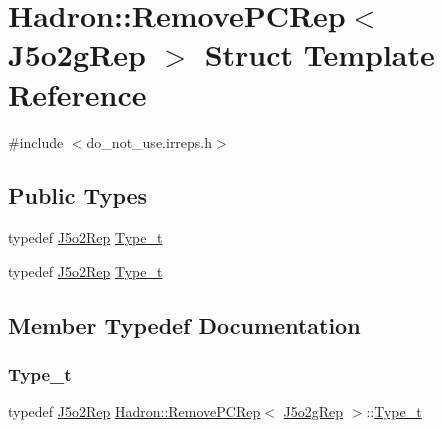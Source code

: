 \hypertarget{structHadron_1_1RemovePCRep_3_01J5o2gRep_01_4}{}\section{Hadron\+:\+:Remove\+P\+C\+Rep$<$ J5o2g\+Rep $>$ Struct Template Reference}
\label{structHadron_1_1RemovePCRep_3_01J5o2gRep_01_4}


{\ttfamily \#include $<$do\+\_\+not\+\_\+use.\+irreps.\+h$>$}

\subsection*{Public Types}
\begin{DoxyCompactItemize}
\item 
typedef \mbox{\hyperlink{structHadron_1_1J5o2Rep}{J5o2\+Rep}} \mbox{\hyperlink{structHadron_1_1RemovePCRep_3_01J5o2gRep_01_4_a2c403d167c34bc5b00820e498b1d6fd3}{Type\+\_\+t}}
\item 
typedef \mbox{\hyperlink{structHadron_1_1J5o2Rep}{J5o2\+Rep}} \mbox{\hyperlink{structHadron_1_1RemovePCRep_3_01J5o2gRep_01_4_a2c403d167c34bc5b00820e498b1d6fd3}{Type\+\_\+t}}
\end{DoxyCompactItemize}


\subsection{Member Typedef Documentation}
\mbox{\label{structHadron_1_1RemovePCRep_3_01J5o2gRep_01_4_a2c403d167c34bc5b00820e498b1d6fd3}} 
\subsubsection{\texorpdfstring{Type\_t}{Type\_t}\hspace{0.1cm}{\footnotesize\ttfamily [1/2]}}
{\footnotesize\ttfamily typedef \mbox{\hyperlink{structHadron_1_1J5o2Rep}{J5o2\+Rep}} \mbox{\hyperlink{structHadron_1_1RemovePCRep}{Hadron\+::\+Remove\+P\+C\+Rep}}$<$ \mbox{\hyperlink{structHadron_1_1J5o2gRep}{J5o2g\+Rep}} $>$\+::\mbox{\hyperlink{structHadron_1_1RemovePCRep_3_01J5o2gRep_01_4_a2c403d167c34bc5b00820e498b1d6fd3}{Type\+\_\+t}}}

